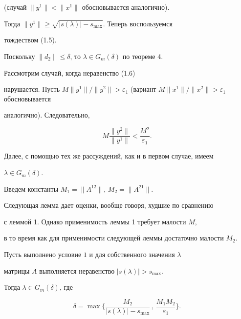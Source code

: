 \begin{pf}
(случай $\|y^1\|<\|x^1\|$ обосновывается аналогично).


Тогда $\|y^1\|\ge \sqrt{|s(\lambda)|-s_{\max}}$. Теперь воспользуемся


тождеством (1.5).


Поскольку $\|d_2\|\le \delta$, то $\lambda\in G_m(\delta)$ по теореме 4.





Рассмотрим случай, когда неравенство (1.6)


нарушается. Пусть $M\|y^1\|/\|y^{2}\|>


\varepsilon_1$ (вариант $M\|x^1\|/\|x^{2}\|>\varepsilon_1$ обосновывается


аналогично). Следовательно,


$$


M\frac{\|y^2\|}{\|y^1\|}<\frac{M^2}{\varepsilon_1}.


$$


Далее, с помощью тех же рассуждений, как и в первом случае, имеем 


$\lambda\in G_m(\delta)$.


\end{pf}





Введем константы $M_1=\|A^{12}\|$, $M_2=\|A^{21}\|$.


Следующая лемма дает оценки, вообще говоря, худшие по сравнению 


с леммой 1. Однако применимость леммы 1 требует малости $M$,


в то время как для применимости следующей леммы достаточно малости $M_2$.





\begin{lem}


Пусть выполнено условие $1$ и для собственного значения $\lambda$


матрицы $A$ выполняется неравенство $|s(\lambda)|>s_{\max}$.


Тогда $\lambda\in G_m(\delta)$, где


$$


\delta=\max \bigg\{\frac{M_2}{|s(\lambda)|-s_{\max}}\,,


\ \frac{M_1 M_2}{\varepsilon_1}\bigg\}.


$$


\end{lem}





